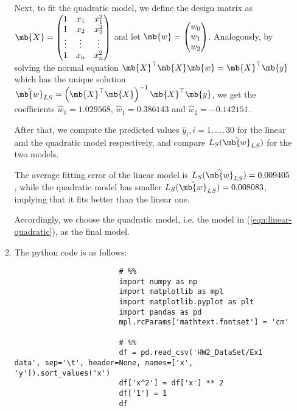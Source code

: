 \begin{exercise}
\begin{enumerate}
\begin{solution}
\begin{enumerate}
                        Next, to fit the quadratic model, we define the design matrix as $\mb{X} = \begin{pmatrix} 1 & x_1 & x_1^2 \\ 1 & x_2 & x_2^2 \\ \vdots & \vdots & \vdots \\ 1 & x_n & x_n^2 \end{pmatrix}$ and let $\mb{w} = \begin{pmatrix} w_0 \\ w_1 \\ w_2 \end{pmatrix}$. 
                        Analogously, by solving the normal equation $\mb{X}^\top\mb{X}\mb{w} = \mb{X}^\top\mb{y}$ which has the unique solution $\hat{\mb{w}}_{LS} = \left(\mb{X}^\top\mb{X}\right)^{-1}\mb{X}^\top\mb{y}$, we get the coefficients $\hat{w}_0 = 1.029568$, $\hat{w}_1 = 0.386143$ and $\hat{w}_2 = -0.142151$.
                        
                        After that, we compute the predicted values $\hat{y}_i, i=1,\ldots,30$ for the linear and the quadratic model respectively, and compare $L_S(\hat{\mb{w}}_{LS})$ for the two models. 
                        
                        The average fitting error of the linear model is $L_S(\hat{\mb{w}}_{LS}) = 0.009405$, while the quadratic model has smaller $L_S(\hat{\mb{w}}_{LS}) = 0.008083$, implying that it fits better than the linear one.
                        
                        Accordingly, we choose the quadratic model, i.e. the model in (\ref{eqn:linear-quadratic}), as the final model.
                        
                    \item The python code is as follows:
                        
                        \begin{verbatim}
                        # %%
                        import numpy as np
                        import matplotlib as mpl
                        import matplotlib.pyplot as plt
                        import pandas as pd
                        mpl.rcParams['mathtext.fontset'] = 'cm'

                        # %%
                        df = pd.read_csv('HW2_DataSet/Ex1 data', sep='\t', header=None, names=['x', 'y']).sort_values('x')
                        df['x^2'] = df['x'] ** 2
                        df['1'] = 1
                        df


\end{verbatim}
\end{enumerate}
\end{solution}
\end{enumerate}
\end{exercise}
